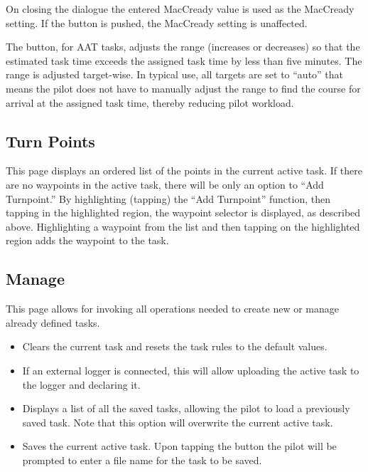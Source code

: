 On closing the dialogue the entered MacCready value is used as the MacCready 
setting. If the  button is pushed, the MacCready setting is 
unaffected.

The  button, for AAT tasks, adjusts the range
(increases or decreases) so that the estimated task time exceeds the
assigned task time by less than five minutes.  The range is adjusted
target-wise. In typical use, all targets are set to ``auto'' that means the pilot
does not have to manually adjust the range to find the course for arrival at 
the assigned task time, thereby reducing pilot workload.

\subsection*{Turn Points}
This page displays an ordered list of the points in the current active task.
If there are no waypoints in the active task, there 
will be only an option to ``Add Turnpoint.''  By highlighting (tapping) the
``Add Turnpoint'' function, then tapping in the highlighted region, the waypoint
selector is displayed, as described above.  Highlighting a waypoint from the 
list and then tapping on the highlighted region adds the waypoint to the task.

\subsection*{Manage}
This page allows for invoking all operations needed to create new or manage 
already defined tasks.


\begin{itemize}
\item [\bmenuw{New Task}] Clears the current task and resets the task rules to 
  the default values.
\item [\bmenuw{Declare}] If an external logger is connected, this will allow 
  uploading the  active task to the logger and declaring it.
\item [\bmenuw{Browse}] Displays a list of all the saved tasks, allowing the 
  pilot to load a previously saved task.  Note that this option will overwrite 
  the current active task.
\item [\bmenuw{Save}] Saves the current active task.  Upon tapping the 
   button the pilot will be prompted to enter a file name for the 
  task to be saved.
\end{itemize}

